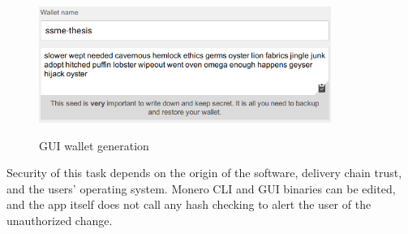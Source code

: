 \documentclass[
  printed, %
  table,   %
  nolof,     %
  nolot,     %
           oneside, color
]{fithesis3}
\begin{document}
\begin{figure}[H]
\begin{center}
    \vspace{-0.8em}
 \includegraphics[trim={0 0 0 0},clip,width=0.85\textwidth]{Screenshot_4.png}
    \caption{GUI wallet generation}
    \vspace{-1.5em}
    \label{pic:guigenerator}
\end{center}
    \end{figure}

Security of this task depends on the origin of the software, delivery chain trust, and the users' operating system. Monero CLI and GUI binaries can be edited, and the app itself does not call any hash checking to alert the user of the unauthorized change. 
\end{document}
